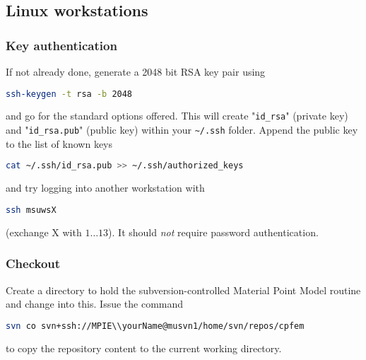 \subsection{Linux workstations}

\subsubsection{Key authentication}
If not already done, generate a 2048 bit RSA key pair using
\begin{lstlisting}[language=bash]
ssh-keygen -t rsa -b 2048
\end{lstlisting}
and go for the standard options offered.
This will create "\verb|id_rsa|" (private key) and "\verb|id_rsa.pub|" (public key) within your \verb|~/.ssh| folder.
Append the public key to the list of known keys
\begin{lstlisting}[language=bash]
cat ~/.ssh/id_rsa.pub >> ~/.ssh/authorized_keys 
\end{lstlisting}
and try logging into another workstation with 
\begin{lstlisting}[language=bash]
ssh msuwsX
\end{lstlisting}
 (exchange X with $1\dots 13$).
It should \emph{not} require password authentication.

\subsubsection{Checkout}
Create a directory to hold the subversion-controlled Material Point Model routine and change into this. 
Issue the command
\begin{lstlisting}[language=bash]
svn co svn+ssh://MPIE\\yourName@musvn1/home/svn/repos/cpfem
\end{lstlisting}
to copy the repository content to the current working directory.
